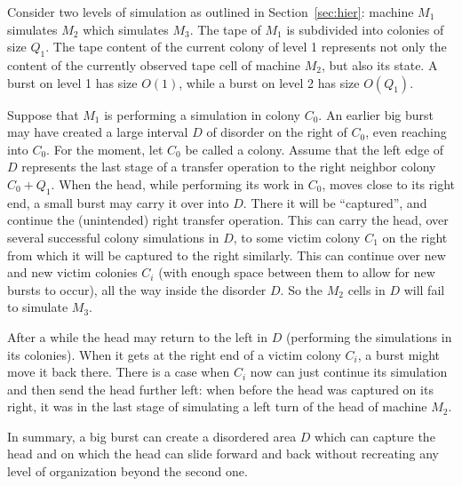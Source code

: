 \documentclass[11pt]{memoir}
\theoremstyle{definition} %
\newcommand{\Q}{Q}
\begin{document}
\begin{example}
Consider two levels of simulation as outlined in Section~\ref{sec:hier}: 
machine \( M_{1} \) simulates \( M_{2} \) which simulates \( M_{3} \).
The tape of \( M_{1} \) is subdivided into colonies of size \( \Q_{1} \).
The tape content of the 
current colony of level 1 represents not only the content of the currently
observed tape cell of machine \( M_{2} \), but also its state.
A burst on level 1 has size \( O(1) \), while a burst on level 2 has size \( O(\Q_{1}) \).

Suppose that \( M_{1} \) is performing a simulation in colony \( C_{0} \).
An earlier big burst may have created a large interval \( D \) of disorder
on the right of \( C_{0} \), even reaching into \( C_{0} \).
For the moment, let \( C_{0} \) be called a  colony.
Assume that the left edge of \( D \) represents the last stage of a transfer operation to the right neighbor 
colony \( C_{0}+Q_{1} \).
When the head, while performing its work in \( C_{0} \), moves close to its right end, a small burst may 
carry it over into \( D \).
There it will be ``captured'', and continue the (unintended) right transfer operation.
This can carry the head, over several successful colony simulations in \( D \), to some
victim colony \( C_{1} \) on the right from which it will be captured to the right similarly.
This can continue over new and new victim colonies \( C_{i} \) (with enough space between them to allow for
new bursts to occur), all the way inside the disorder \( D \).
So the \( M_{2} \) cells in \( D \) will fail to simulate \( M_{3} \).

After a while the head may return to the left in \( D \)
(performing the simulations in its colonies).
When it gets at the right end of a victim colony \( C_{i} \), a burst might move it back there.
There is a case when \( C_{i} \) now can just continue its simulation and then send the head
further left: when before the head was captured on its right,
it was in the last stage of simulating a left turn of the head of machine \( M_{2} \).

In summary, 
a big burst can create a disordered area \( D \) which can capture the head and on which the head can slide
forward and back without recreating any level of organization beyond the second one.
\end{example}
\end{document}
